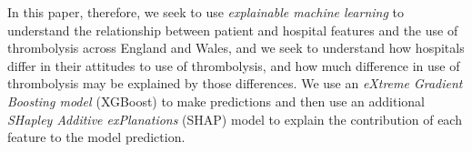
In this paper, therefore, we seek to use \emph{explainable machine learning} to understand the relationship between patient and hospital features and the use of thrombolysis across England and Wales, and we seek to understand how hospitals differ in their attitudes to use of thrombolysis, and how much difference in use of thrombolysis may be explained by those differences. We use an \emph{eXtreme Gradient Boosting model \cite{chen_xgboost_2016}} (XGBoost) to make predictions and then use an additional \emph{SHapley Additive exPlanations} \cite{lundberg_unified_2017} (SHAP) model to explain the contribution of each feature to the model prediction.

